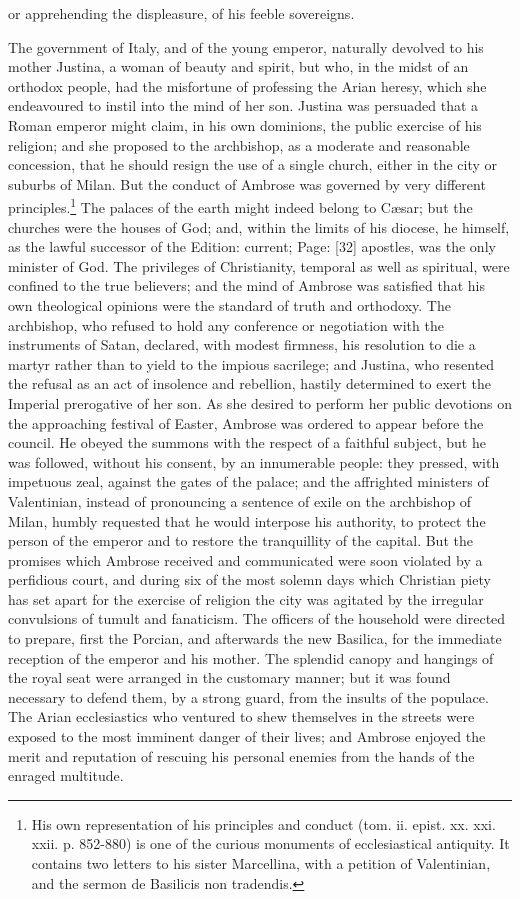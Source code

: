 or apprehending the displeasure, of his feeble sovereigns.

The government of Italy, and of the young emperor, naturally devolved to his mother Justina, a woman of beauty and spirit, but who, in the midst of an orthodox people, had the misfortune of professing the Arian heresy, which she endeavoured to instil into the mind of her son. Justina was persuaded that a Roman emperor might claim, in his own dominions, the public exercise of his religion; and she proposed to the archbishop, as a moderate and reasonable concession, that he should resign the use of a single church, either in the city or suburbs of Milan. But the conduct of Ambrose was governed by very different principles.\footnote{His own representation of his principles and conduct (tom. ii. epist. xx. xxi. xxii. p. 852-880) is one of the curious monuments of ecclesiastical antiquity. It contains two letters to his sister Marcellina, with a petition of Valentinian, and the sermon de Basilicis non tradendis.} The palaces of the earth might indeed belong to Cæsar; but the churches were the houses of God; and, within the limits of his diocese, he himself, as the lawful successor of the Edition: current; Page: [32] apostles, was the only minister of God. The privileges of Christianity, temporal as well as spiritual, were confined to the true believers; and the mind of Ambrose was satisfied that his own theological opinions were the standard of truth and orthodoxy. The archbishop, who refused to hold any conference or negotiation with the instruments of Satan, declared, with modest firmness, his resolution to die a martyr rather than to yield to the impious sacrilege; and Justina, who resented the refusal as an act of insolence and rebellion, hastily determined to exert the Imperial prerogative of her son. As she desired to perform her public devotions on the approaching festival of Easter, Ambrose was ordered to appear before the council. He obeyed the summons with the respect of a faithful subject, but he was followed, without his consent, by an innumerable people: they pressed, with impetuous zeal, against the gates of the palace; and the affrighted ministers of Valentinian, instead of pronouncing a sentence of exile on the archbishop of Milan, humbly requested that he would interpose his authority, to protect the person of the emperor and to restore the tranquillity of the capital. But the promises which Ambrose received and communicated were soon violated by a perfidious court, and during six of the most solemn days which Christian piety has set apart for the exercise of religion the city was agitated by the irregular convulsions of tumult and fanaticism. The officers of the household were directed to prepare, first the Porcian, and afterwards the new Basilica, for the immediate reception of the emperor and his mother. The splendid canopy and hangings of the royal seat were arranged in the customary manner; but it was found necessary to defend them, by a strong guard, from the insults of the populace. The Arian ecclesiastics who ventured to shew themselves in the streets were exposed to the most imminent danger of their lives; and Ambrose enjoyed the merit and reputation of rescuing his personal enemies from the hands of the enraged multitude.

